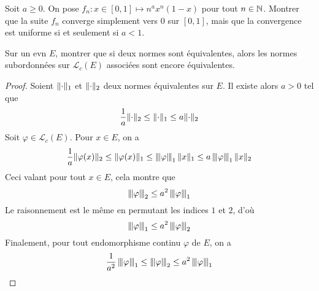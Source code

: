 \documentclass[10pt]{scrartcl}
\begin{document}
    \begin{exo}
       Soit $a\geq 0$. On pose $f_n:x\in[0,1]\mapsto n^ax^n(1-x)$ pour tout $n\in \operatorname{\mathbb N}$. Montrer que la suite $f_n$ converge simplement vers $0$ sur $[0,1]$, mais que la convergence est uniforme si et seulement si $a<1$.
    \end{exo}

    \begin{exo}
        Sur un evn $E$, montrer que si deux normes sont équivalentes, alors les normes subordonnées sur $\mathcal L_c(E)$ associées sont encore équivalentes.
    \end{exo}

    \begin{proof}
        Soient $\lVert \cdot\rVert_1$ et $\lVert \cdot\rVert_2$ deux normes équivalentes sur $E$. 
        Il existe alors $a>0$ tel que 
        \[
            \frac1a\lVert \cdot\rVert_2\leq \lVert \cdot\rVert_1\leq a\lVert \cdot\rVert_2
        \]
        Soit $\varphi\in\mathcal L_c(E)$. Pour $x\in E$, on a 
        \[
            \frac1a\lVert \varphi(x)\rVert_2\leq\lVert \varphi(x)\rVert_1\leq\left|\hskip-.12em\lVert \varphi\rVert\hskip-.12em\right|_1\lVert x\rVert_1\leq a\left|\hskip-.12em\lVert \varphi\rVert\hskip-.12em\right|_1\lVert x\rVert_2
        \]
        Ceci valant pour tout $x\in E$, cela montre que 
        \[
            \left|\hskip-.12em\lVert \varphi\rVert\hskip-.12em\right|_2\leq a^2\left|\hskip-.12em\lVert \varphi\rVert\hskip-.12em\right|_1
        \]
        Le raisonnement est le même en permutant les indices $1$ et $2$, d'où
        \[
            \left|\hskip-.12em\lVert \varphi\rVert\hskip-.12em\right|_1\leq a^2\left|\hskip-.12em\lVert \varphi\rVert\hskip-.12em\right|_2
        \]
        Finalement, pour tout endomorphisme continu $\varphi$ de $E$, on a 
        \[
            \frac1{a^2}\left|\hskip-.12em\lVert \varphi\rVert\hskip-.12em\right|_1\leq\left|\hskip-.12em\lVert \varphi\rVert\hskip-.12em\right|_2\leq a^2\left|\hskip-.12em\lVert \varphi\rVert\hskip-.12em\right|_1
        \]
    \end{proof}
\end{document}
